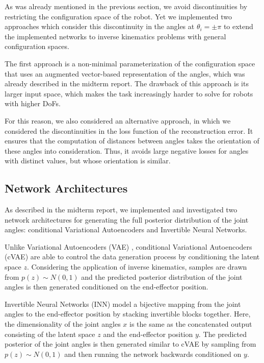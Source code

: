 \documentclass[conference]{IEEEtran}
\begin{document}
As was already mentioned in the previous section, we avoid discontinuities by restricting the configuration space of the robot. Yet we implemented two approaches which consider this discontinuity in the angles at $\theta_i = \pm \pi$ to extend the implemented networks to inverse kinematics problems with general configuration spaces.

The first approach is a non-minimal parameterization of the configuration space that uses an augmented vector-based representation of the angles, which was already described in the midterm report. The drawback of this approach is its larger input space, which makes the task increasingly harder to solve for robots with higher DoFs.

For this reason, we also considered an alternative approach, in which we considered the discontinuities in the loss function of the reconstruction error. It ensures that the computation of distances between angles takes the orientation of these angles into consideration. Thus, it avoids large negative losses for angles with distinct values, but whose orientation is similar.

\subsection*{Network Architectures}

As described in the midterm report, we implemented and investigated two network architectures for generating the full posterior distribution of the joint angles: conditional Variational Autoencoders and Invertible Neural Networks. 

Unlike Variational Autoencoders (VAE) \cite{Kingma2014}, conditional Variational Autoencoders (cVAE) \cite{Sohn2015} are able to control the data generation process by conditioning the latent space $z$. Considering the application of inverse kinematics, samples are drawn from $p(z) \sim N(0, 1)$ and the predicted posterior distribution of the joint angles is then generated conditioned on the end-effector position.

Invertible Neural Networks (INN) \cite{Ardizzone2018} model a bijective mapping from the joint angles to the end-effector position by stacking invertible blocks together. Here, the dimensionality of the joint angles $x$ is the same as the concatenated output consisting of the latent space $z$ and the end-effector position $y$. The predicted posterior of the joint angles is then generated similar to cVAE by sampling from $p(z) \sim N(0, 1)$ and then running the network backwards conditioned on $y$.
\end{document}
